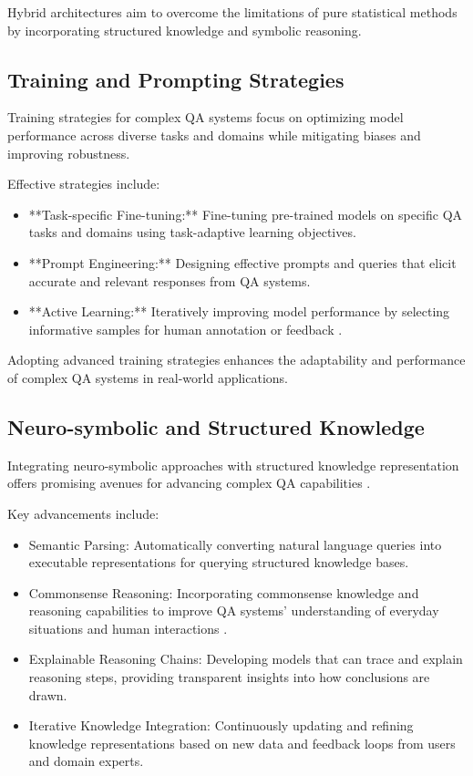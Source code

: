\documentclass[a4paper,12pt]{article}
\begin{document}
Hybrid architectures aim to overcome the limitations of pure statistical methods by incorporating structured knowledge and symbolic reasoning.

\subsection{Training and Prompting Strategies}
\label{subsec:training_strategies}

Training strategies for complex QA systems focus on optimizing model performance across diverse tasks and domains while mitigating biases and improving robustness.

Effective strategies include:

\begin{itemize}
    \item **Task-specific Fine-tuning:** Fine-tuning pre-trained models on specific QA tasks and domains using task-adaptive learning objectives.
    \item **Prompt Engineering:** Designing effective prompts and queries that elicit accurate and relevant responses from QA systems.
    \item **Active Learning:** Iteratively improving model performance by selecting informative samples for human annotation or feedback \cite{gpt3_paper}.
\end{itemize}

Adopting advanced training strategies enhances the adaptability and performance of complex QA systems in real-world applications.

\subsection{Neuro-symbolic and Structured Knowledge}
\label{subsec
}

Integrating neuro-symbolic approaches with structured knowledge representation offers promising avenues for advancing complex QA capabilities \cite{knowledge_graphs_paper}.

Key advancements include:

\begin{itemize}
\item Semantic Parsing: Automatically converting natural language queries into executable representations for querying structured knowledge bases.
\item Commonsense Reasoning: Incorporating commonsense knowledge and reasoning capabilities to improve QA systems' understanding of everyday situations and human interactions \cite{knowledge_graphs_paper}.
\item Explainable Reasoning Chains: Developing models that can trace and explain reasoning steps, providing transparent insights into how conclusions are drawn.
\item Iterative Knowledge Integration: Continuously updating and refining knowledge representations based on new data and feedback loops from users and domain experts.
\end{itemize}
\end{document}
